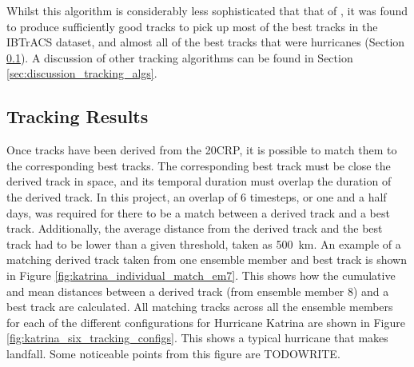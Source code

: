 \documentclass[pdftex,12pt,a4paper]{report}
\begin{document}
Whilst this algorithm is considerably less sophisticated that that of \textcite{hodges1994}, it was
found to produce sufficiently good tracks to pick up most of the best tracks in the IBTrACS dataset,
and almost all of the best tracks that were hurricanes (Section  \ref{sec:results_tracking}). A
discussion of other tracking algorithms can be found in Section \ref{sec:discussion_tracking_algs}.

\subsection{Tracking Results}
\label{sec:results_tracking}

Once tracks have been derived from the 20CRP, it is possible to match them to the corresponding best
tracks. The corresponding best track must be close the derived track in space, and its temporal
duration must overlap the duration of the derived track. In this project, an overlap of 6 timesteps,
or one and a half days, was required for there to be a match between a derived track and a best
track.  Additionally, the average distance from the derived track and the best track had to be lower
than a given threshold, taken as \SI{500}{km}. An example of a matching derived track taken from
one ensemble member and best track is shown in Figure \ref{fig:katrina_individual_match_em7}.
This shows how the cumulative and mean distances between a derived track (from ensemble member 8)
and a best track are calculated. All matching tracks across all the ensemble members for each of the
different configurations for Hurricane Katrina are shown in Figure
\ref{fig:katrina_six_tracking_configs}. This shows a typical hurricane that makes landfall. Some
noticeable points from this figure are TODOWRITE.
\end{document}
